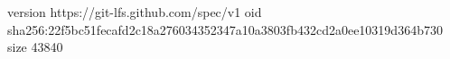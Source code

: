 version https://git-lfs.github.com/spec/v1
oid sha256:22f5bc51fecafd2c18a276034352347a10a3803fb432cd2a0ee10319d364b730
size 43840

